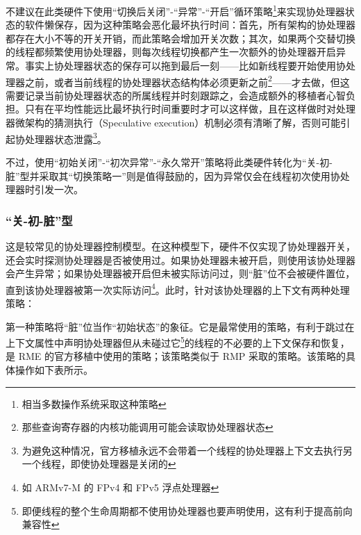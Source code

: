 不建议在此类硬件下使用``切换后关闭''-``异常''-``开启''循环策略\footnote{相当多数操作系统采取这种策略}来实现协处理器状态的软件懒保存，因为这种策略会恶化最坏执行时间：首先，所有架构的协处理器都存在大小不等的开关开销，而此策略会增加开关次数；其次，如果两个交替切换的线程都频繁使用协处理器，则每次线程切换都产生一次额外的协处理器开启异常。事实上协处理器状态的保存可以拖到最后一刻------比如新线程要开始使用协处理器之前，或者当前线程的协处理器状态结构体必须更新之前\footnote{那些查询寄存器的内核功能调用可能会读取协处理器状态}------才去做，但这需要记录当前协处理器状态的所属线程并时刻跟踪之，会造成额外的移植者心智负担。只有在平均性能远比最坏执行时间重要时才可以这样做，且在这样做时对处理器微架构的猜测执行（Speculative
execution）机制必须有清晰了解，否则可能引起协处理器状态泄露\footnote{为避免这种情况，官方移植永远不会带着一个线程的协处理器上下文去执行另一个线程，即使协处理器是关闭的}。

不过，使用``初始关闭''-``初次异常''-``永久常开''策略将此类硬件转化为``关-初-脏''型并采取其``切换策略一''则是值得鼓励的，因为异常仅会在线程初次使用协处理器时引发一次。

\subsubsection{``关-初-脏''型}\label{subsubsec:9-coproc-off-initial-dirty}

这是较常见的协处理器控制模型。在这种模型下，硬件不仅实现了协处理器开关，还会实时探测协处理器是否被使用过。如果协处理器未被开启，则使用该协处理器会产生异常；如果协处理器被开启但未被实际访问过，则``脏''位不会被硬件置位，直到该协处理器被第一次实际访问\footnote{如 ARMv7-M 的 FPv4 和 FPv5 浮点处理器}。此时，针对该协处理器的上下文有两种处理策略：

第一种策略将``脏''位当作``初始状态''的象征。它是最常使用的策略，有利于跳过在上下文属性中声明协处理器但从未碰过它\footnote{即便线程的整个生命周期都不使用协处理器也要声明使用，这有利于提高前向兼容性}的线程的不必要的上下文保存和恢复，是 RME 的官方移植中使用的策略；该策略类似于 RMP 采取的策略。该策略的具体操作如下表所示。

